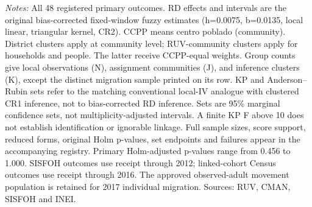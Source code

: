 \noindent\footnotesize\textit{Notes:} All 48 registered primary outcomes. RD effects and intervals are the original bias-corrected fixed-window fuzzy estimates (h=0.0075, b=0.0135, local linear, triangular kernel, CR2). CCPP means centro poblado (community). District clusters apply at community level; RUV-community clusters apply for households and people. The latter receive CCPP-equal weights. Group counts give local observations (N), assignment communities (J), and inference clusters (K), except the distinct migration sample printed on its row. KP and Anderson--Rubin sets refer to the matching conventional local-IV analogue with clustered CR1 inference, not to bias-corrected RD inference. Sets are 95\% marginal confidence sets, not multiplicity-adjusted intervals. A finite KP F above 10 does not establish identification or ignorable linkage. Full sample sizes, score support, reduced forms, original Holm p-values, set endpoints and failures appear in the accompanying registry. Primary Holm-adjusted p-values range from 0.456 to 1.000. SISFOH outcomes use receipt through 2012; linked-cohort Census outcomes use receipt through 2016. The approved observed-adult movement population is retained for 2017 individual migration. Sources: RUV, CMAN, SISFOH and INEI.\normalsize
